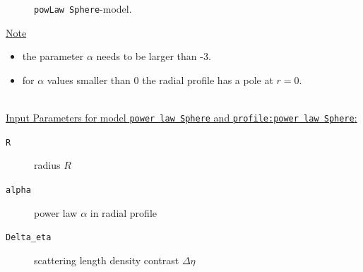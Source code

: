 \begin{figure}[htb]
\captionsetup[subfigure]{position=b}
\centering
{}
\hfill
{}
\caption{\texttt{powLaw Sphere}-model.}
\label{fig:PowerLaw}
\end{figure}

\noindent
\uline{Note}
\begin{itemize}
  \item the parameter $\alpha$ needs to be larger than -3.
  \item for $\alpha$ values smaller than 0 the radial profile has a pole at $r=0$.
\end{itemize}

\hspace{1pt}\\
\uline{Input Parameters for model \texttt{power law Sphere} and \texttt{profile:power law Sphere}:}
\begin{description}
\item[\texttt{R}] radius $R$
\item[\texttt{alpha}] power law $\alpha$ in radial profile
\item[\texttt{Delta\_eta}] scattering length density contrast $\Delta\eta$
\end{description}

